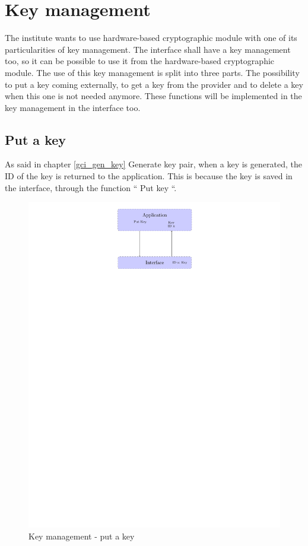 \section{Key management}

\label{gci_key_mng}

The institute wants to use hardware-based cryptographic module with one of its
particularities of key management. The interface shall have a key management
too, so it can be possible to use it from the hardware-based cryptographic module.
The use of this key management is split into three parts. The possibility to put
a key coming externally, to get a key from the provider and to delete a key when
this one is not needed anymore. These functions will be implemented in the key
management in the interface too.


\subsection*{Put a key}
As said in chapter \ref{gci_gen_key} Generate key pair, when a key is generated,
the ID of the key is returned to the application.
This is because the key is saved in the interface, through the function `` Put
key ``.


\begin{figure}[!ht]
\centering
\includegraphics[trim=12cm 22cm 11.5cm 0cm]{figures/key_manag_put_key.pdf}
\caption{Key management - put a key}
\label{fig:gci_key_mng_put}
\end{figure}

